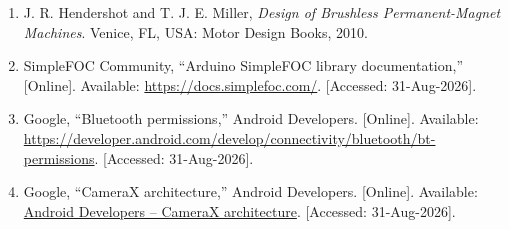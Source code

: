 \begin{enumerate}
    \item \label{ref:foc} J. R. Hendershot and T. J. E. Miller, \textit{Design of Brushless Permanent-Magnet Machines}. Venice, FL, USA: Motor Design Books, 2010.
    \item \label{ref:simplefoc} SimpleFOC Community, ``Arduino SimpleFOC library documentation,'' [Online]. Available: \url{https://docs.simplefoc.com/}. [Accessed: 31-Aug-2026].
    \item \label{ref:android_permissions} Google, ``Bluetooth permissions,'' Android Developers. [Online]. Available: \url{https://developer.android.com/develop/connectivity/bluetooth/bt-permissions}. [Accessed: 31-Aug-2026].
    \item \label{ref:android_camera} Google, ``CameraX architecture,'' Android Developers. [Online]. Available: \href{https://developer.android.com/media/camera/camerax/architecture}{Android Developers -- CameraX architecture}. [Accessed: 31-Aug-2026].
\end{enumerate}
